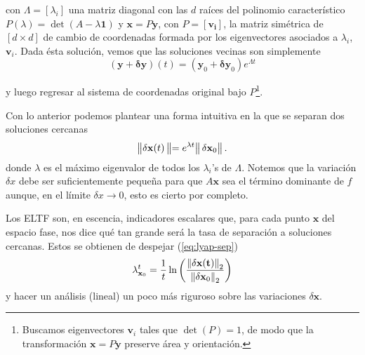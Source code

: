 con $\Lambda = [\lambda_i]$ una matriz diagonal con las $d$ raíces del polinomio característico $P(\lambda) = \det(A - \lambda \mathbf{1})$ y $\mathbf{x} = P \mathbf{y}$, con $P = [\mathbf{v_i}]$, la matriz simétrica de $[d \times d]$ de cambio de coordenadas formada por los eigenvectores asociados a $\lambda_i$, $\mathbf{v}_i$.
Dada ésta solución, vemos que las soluciones vecinas son simplemente 
\begin{equation*}
 (\mathbf{y} + \mathbf{\delta y})(t) = (\mathbf{y}_0 + \mathbf{\delta y}_0) e^{\Lambda t}
\end{equation*}

y luego regresar al sistema de coordenadas original bajo $P$\footnote{Buscamos eigenvectores $\mathbf{v}_i$ tales que $\det(P) = 1$, de modo que la transformación $\mathbf{x} = P \mathbf{y}$ preserve área y orientación.}. 


Con lo anterior podemos plantear una forma intuitiva en la que se separan dos soluciones cercanas
\begin{equation}
 \left\lVert \mathbf{\delta x}(t) \left\lVert = e^{\lambda t} \right\rVert \mathbf{\delta x}_0 \right\rVert.
 \label{eq:lyap-sep}
\end{equation}
donde $\lambda$ es el máximo eigenvalor de todos los $\lambda_i$'s de $\Lambda$. Notemos que la variación $\delta x$ debe ser suficientemente pequeña para que $A\mathbf{x}$ sea el término dominante de $f$ aunque, en el límite $\delta x \to 0$, esto es cierto por completo. 

Los ELTF son, en escencia, indicadores escalares que, para cada punto $\mathbf{x}$ del espacio fase, nos dice qué tan grande será la tasa de separación a soluciones cercanas. Estos se obtienen de despejar (\ref{eq:lyap-sep})
\begin{equation}
 \lambda_{\mathbf{x}_0}^t = \frac{1}{t}\ln \left( \frac{\left\lVert\mathbf{ \delta x(t)} \right\rVert_2}{\left\lVert \mathbf{\delta x}_0 \right\rVert_2} \right)
 \label{eq:lyap-exp}
\end{equation}
y hacer un análisis (lineal) un poco más riguroso sobre las variaciones $\delta \mathbf{x}$.

